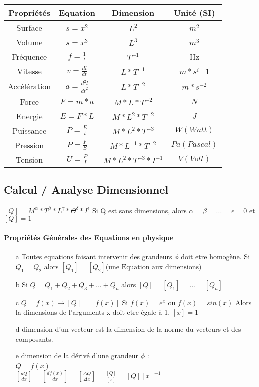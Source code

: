 \begin{tabular}{|c|c|c|c|}
	Propriétés & Equation & Dimension & Unité (SI) \\
	\hline
	Surface & $s=x^2$ &$ L^2$ & $m^2$\\
	Volume & $s=x^3$ &$ L^3$ & $m^3$\\
	Fréquence & $f=\frac{1}{t}$ & $T^{-1}$ & Hz \\
	Vitesse & $v=\frac{dl}{dt}$ & $L*T^{-1}$ & $m*s^i{-1}$ \\
	Accélération& $a=\frac{d^2l}{dt^2}$ & $L*T^{-2}$ & $m*s^{-2}$ \\
	Force & $F=m*a$ & $M*L*T^{-2}$ & $N$ \\
	Energie & $E=F*L$ & $M*L^2*T^{-2}$ & $J$ \\
	Puissance & $P=\frac{E}{t}$ & $M*L^2*T^{-3}$ & $W (Watt)$ \\
	Pression & $P=\frac{F}{S}$ & $M*L^{-1}*T^{-2}$ & $Pa (Pascal)$ \\
	Tension & $U=\frac{P}{I}$ & $M*L^2*T^{-3}*I^{-1}$ & $V (Volt)$
\end{tabular}

\subsection{Calcul / Analyse Dimensionnel}
$[Q] = M^\alpha * T^\beta * L^\gamma * \Theta^\delta * I^\epsilon$
Si Q est sans dimensions, alors $\alpha = \beta =...=\epsilon=0$ et 
$[Q]=1$

\paragraph{Propriétés Générales des Equations en physique}
\begin{itemize}
	\item[a] Toutes equations faisant intervenir des grandeurs $\phi$ doit etre homogène.
		Si $Q_1 = Q_2$ alors $[Q_1] = [Q_2] \text{(une Equation aux dimensions)}$
	\item[b] Si $Q=Q_1 + Q_2 + Q_3 + ... + Q_n$ alors $[Q]=[Q_1]=...=[Q_n]$
	\item[c] $Q = f(x) \rightarrow [Q] = [f(x)]$
		Si $f(x) = e^x$ ou  $f(x) = sin(x)$ Alors la dimensions de l'arguments x doit etre égale à 1. $[x] = 1$
	\item[d] dimension d'un vecteur est la dimension de la norme du vecteurs et des composants.
	\item[e] dimension de la dérivé d'une grandeur $\phi$ : ~\\
		$Q=f(x)$ ~\\
		$[\frac{dQ}{dx}] = [\frac{df(x)}{dx}]=[\frac{\Delta Q}{\Delta x}] = \frac{[Q]}{[x]} = [Q][x]^{-1}$
\end{itemize}

